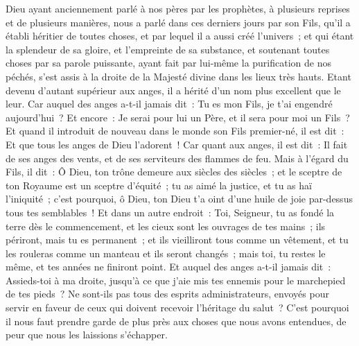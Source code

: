 \begin{multicols}{2}
\VerseOne{}Dieu ayant anciennement parlé à nos pères par les prophètes, à plusieurs reprises et de plusieurs manières,
nous a parlé dans ces derniers jours par son Fils, qu'il a établi héritier de toutes choses, et par lequel il a aussi créé l'univers~;
et qui étant la splendeur de sa gloire, et l'empreinte de sa substance, et soutenant toutes choses par sa parole puissante, ayant fait par lui-même la purification de nos péchés, s'est assis à la droite de la Majesté divine dans les lieux très hauts.
Etant devenu d'autant supérieur aux anges, il a hérité d'un nom plus excellent que le leur.
Car auquel des anges a-t-il jamais dit~: Tu es mon Fils, je t'ai engendré aujourd'hui~? Et encore~: Je serai pour lui un Père, et il sera pour moi un Fils~?
Et quand il introduit de nouveau dans le monde son Fils premier-né, il est dit~: Et que tous les anges de Dieu l'adorent~!
Car quant aux anges, il est dit~: Il fait de ses anges des vents, et de ses serviteurs des flammes de feu.
Mais à l'égard du Fils, il dit~: Ô Dieu, ton trône demeure aux siècles des siècles~; et le sceptre de ton Royaume est un sceptre d'équité~;
tu as aimé la justice, et tu as haï l'iniquité~; c'est pourquoi, ô Dieu, ton Dieu t'a oint d'une huile de joie par-dessus tous tes semblables~!
Et dans un autre endroit~: Toi, Seigneur, tu as fondé la terre dès le commencement, et les cieux sont les ouvrages de tes mains~;
ils périront, mais tu es permanent~; et ils vieilliront tous comme un vêtement,
et tu les rouleras comme un manteau et ils seront changés~; mais toi, tu restes le même, et tes années ne finiront point.
Et auquel des anges a-t-il jamais dit~: Assieds-toi à ma droite, jusqu'à ce que j'aie mis tes ennemis pour le marchepied de tes pieds~?
Ne sont-ils pas tous des esprits administrateurs, envoyés pour servir en faveur de ceux qui doivent recevoir l'héritage du salut~?
\VerseOne{}C'est pourquoi il nous faut prendre garde de plus près aux choses que nous avons entendues, de peur que nous les laissions s'échapper.

\end{multicols}
